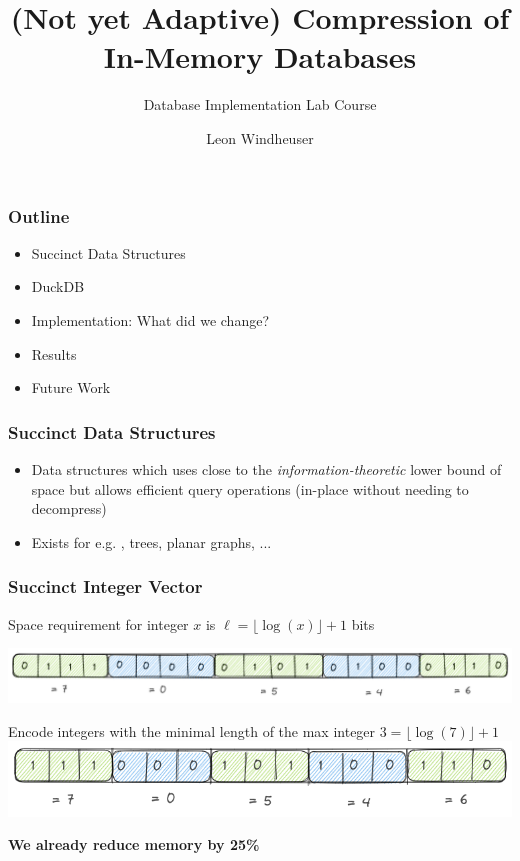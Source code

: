 \documentclass{beamer}
\title{(Not yet Adaptive) Compression of In-Memory Databases}
\subtitle{Database Implementation Lab Course}
\author{Leon Windheuser}
\begin{document}
\frame{\titlepage}

\begin{frame}
    \frametitle{Outline}
    \begin{itemize}
        \item Succinct Data Structures
        \item DuckDB
        \item Implementation: What did we change? 
        \item Results
        \item Future Work
    \end{itemize}
\end{frame}

\begin{frame}
    \frametitle{Succinct Data Structures}
    
    \begin{itemize}
        \item Data structures which uses close to the \textit{information-theoretic} lower bound of space but 
    allows efficient query operations (in-place without needing to decompress)
        \item Exists for e.g. {}, trees, planar graphs, ...
    \end{itemize}
\end{frame}

\begin{frame}
    \frametitle{Succinct Integer Vector}
    \centering
    Space requirement for integer $x$ is $\ell = \lfloor \log(x) \rfloor + 1$ bits

    \includegraphics[width=\framewidth]{figures/excalidraw/bit-int-vector.png}
    \pause

    Encode integers with the minimal length of the max integer $3 = \lfloor \log(7) \rfloor + 1$ \\
    \vspace{0.5cm} 
    \includegraphics[width=0.75\framewidth]{figures/excalidraw/bit-compressed-int-vector.png}

    \vspace{0.5cm}
    \textbf{We already reduce memory by 25\%}
\end{frame}
\end{document}
